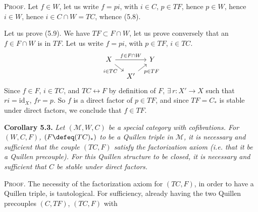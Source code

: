 \textsc{Proof}. Let $f \in W$, let us write $f = pi$, with $i \in C$, $p \in TF$, hence $p \in W$, hence $i \in W$, hence $i \in C \cap W = TC$, whence (5.8).

Let us prove (5.9). We have $TF \subset F \cap W$, let us prove conversely that an $f \in F \cap W$ is in $TF$. Let us write $f = pi$, with $p \in TF$, $i \in TC$.
\[
\begin{tikzcd}[column sep=small, row sep=small]
X \arrow[rr, "f\in F\cap W"] \arrow[dr, "i\in TC"'] & & Y \\
& X' \arrow[ur, "p\in TF"'] &
\end{tikzcd}
\]
Since $f \in F$, $i \in TC$, and $TC \longleftrightarrow F$ by definition of $F$, $\exists\, r : X' \longrightarrow X$ such that $ri = \mathrm{id}_X$, $fr = p$. So $f$ is a direct factor of $p \in TF$, and since $TF = C_{*}$ is stable under direct factors, we conclude that $f \in TF$.

\textbf{Corollary 5.3.} \textit{Let $(\mathcal{M}, W, C)$ be a special category with cofibrations. For $(W, C, F)$, $(F \defeq (TC)_{*})$ to be a Quillen triple in $\mathcal{M}$, it is necessary and sufficient that the couple $(TC, F)$ satisfy the factorization axiom (i.e. that it be a Quillen precouple). For this Quillen structure to be closed, it is necessary and sufficient that $C$ be stable under direct factors.} %


\textsc{Proof}. The necessity of the factorization axiom for $(TC, F)$, in order to have a Quillen triple, is tautological. For sufficiency, already having the two Quillen precouples $(C, TF)$, $(TC, F)$ with
